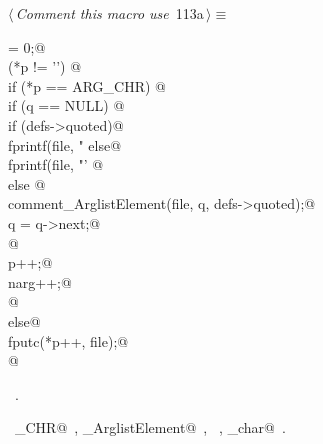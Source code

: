 \documentclass[a4paper]{report}
\begin{document}
\begin{flushleft} \small
\begin{minipage}{\linewidth}\label{scrap239}\raggedright\small
{} $\langle\,${\it Comment this macro use}\nobreak\ {\footnotesize {113a}}$\,\rangle\equiv$
\vspace{-1ex}
\begin{list}{}{} \item
\mbox{}\verb@narg = 0;@\\
\mbox{}\verb@while (*p != '') {@\\
\mbox{}\verb@  if (*p == ARG_CHR) {@\\
\mbox{}\verb@    if (q == NULL) {@\\
\mbox{}\verb@       if (defs->quoted)@\\
\mbox{}\verb@          fprintf(file, "%c'%s%c'", nw_char, inParams[narg], nw_char);@\\
\mbox{}\verb@       else@\\
\mbox{}\verb@          fprintf(file, "'%s'", inParams[narg]);@\\
\mbox{}\verb@    }@\\
\mbox{}\verb@    else {@\\
\mbox{}\verb@      comment_ArglistElement(file, q, defs->quoted);@\\
\mbox{}\verb@      q = q->next;@\\
\mbox{}\verb@    }@\\
\mbox{}\verb@    p++;@\\
\mbox{}\verb@    narg++;@\\
\mbox{}\verb@  }@\\
\mbox{}\verb@  else@\\
\mbox{}\verb@     fputc(*p++, file);@\\
\mbox{}\verb@}@{\NWsep}
\end{list}
\vspace{-1.5ex}
\footnotesize
\begin{list}{}{\setlength{\itemsep}{-\parsep}\setlength{\itemindent}{-\leftmargin}}
\item \NWtxtMacroRefIn\ .
\item \NWtxtIdentsUsed\nobreak\  \verb@ARG_CHR@\nobreak\ , \verb@comment_ArglistElement@\nobreak\ , \verb@fprintf@\nobreak\ , \verb@nw_char@\nobreak\ .
\item{}
\end{list}
\end{minipage}\vspace{4ex}
\end{flushleft}
\end{document}
